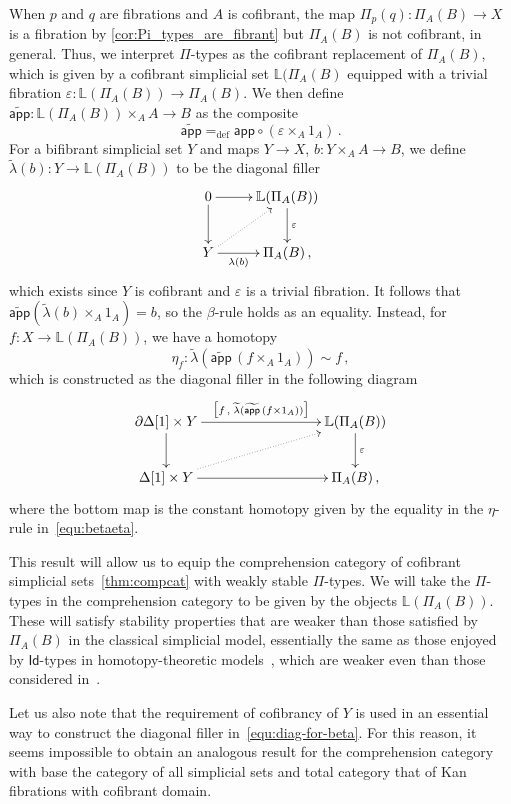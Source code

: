 \documentclass[reqno,10pt,a4paper,oneside,draft]{amsart}
\numberwithin{equation}{section}
\theoremstyle{mythm}
\theoremstyle{mydef}
\theoremstyle{myrmk}
\newcommand{\defeq}{=_{\operatorname{def}}}
\newcommand{\co}{\colon}
\begin{document}
\begin{remark}
 When $p$ and $q$ are fibrations and $A$ is cofibrant, the map 
 $\Pi_p(q) \co \Pi_A(B) \to X$ is a fibration by \cref{cor:Pi_types_are_fibrant} but $\Pi_A(B)$ is not cofibrant,
 in general. Thus, we interpret  $\Pi$-types as the 
 cofibrant replacement  of $\Pi_A(B)$, which is given by a cofibrant simplicial set
 $\mathbb{L}(\Pi_A(B)$  equipped with
 a trivial fibration $\varepsilon \co \mathbb{L}(\Pi_A(B)) \to \Pi_A(B)$. 
We then define $\widetilde{\mathsf{app}} \co   \mathbb{L}(\Pi_A(B)) \times_A A \to B$ as the composite
\[
\widetilde{\mathsf{app}}  \defeq \mathsf{app} \circ (\varepsilon \times_A 1_A) \, .
\]
For a bifibrant simplicial set $Y$ and maps $Y \to X$,  $b \co Y \times_A A \to B$, we define $\widetilde{\lambda}(b) \co Y \to \mathbb{L}(\Pi_A(B))$ to be the
diagonal filler
\begin{equation}
\label{equ:diag-for-beta}
\begin{gathered}
\xymatrix{
0 \ar[r] \ar[d] & \mathbb{L}(\Pi_A(B))  \ar[d]^\varepsilon \\
Y \ar[r]_-{\lambda(b)} \ar@{.>}[ur] & \Pi_A(B) \, ,}
\end{gathered}
\end{equation} 
which exists since $Y$ is cofibrant and $\varepsilon$ is a trivial fibration. It follows 
that~$ \widetilde{\mathsf{app}}(\widetilde{\lambda}(b) \times_A 1_A) = b$, 
so the $\beta$-rule holds as an equality. Instead, for $f \co X \to \mathbb{L}(\Pi_A(B))$, we have a homotopy
\[
\eta_f  \co \widetilde{\lambda}( \widetilde{\mathsf{app}} \, (f \times_A 1_A)) \sim  f  \, ,
\]
which is constructed as the diagonal filler in the following diagram
\[
\xymatrix@C=3cm{
\partial \Delta[1] \times Y \ar[r]^-{\big[f \, , \;  \widetilde{\lambda} ( 
\widetilde{\mathsf{app}} \,  (f \times 1_A) ) \big]} \ar[d] & \mathbb{L}(\Pi_A(B)) \ar[d]^\varepsilon \\
\Delta[1] \times Y \ar[r] \ar@{.>}[ur] & \Pi_A(B) \, , }
\]
where the bottom map is the constant homotopy given by the equality in the $\eta$-rule in~\eqref{equ:betaeta}. 

This result will allow us to equip the comprehension category
of cofibrant simplicial sets~\cref{thm:compcat} with weakly stable $\Pi$-types. We 
will take the $\Pi$-types in the comprehension category to be given by the objects
$ \mathbb{L}(\Pi_A(B))$. These will satisfy  stability properties that are weaker than those satisfied by $\Pi_A(B)$ in the classical simplicial model, 
essentially the same as those enjoyed by $\mathsf{Id}$-types in homotopy-theoretic models~\cite{awodey-warren:homotopy-idtype}, which are weaker even than those considered in~\cite{CarboniA:locccec}.  

Let us also note that the requirement of cofibrancy of $Y$ is used in an 
essential way to construct the diagonal filler in~\eqref{equ:diag-for-beta}. For this
reason, it seems impossible to obtain an analogous result for the comprehension category 
with base the category of all simplicial sets and total category that of Kan fibrations 
with cofibrant domain.
\end{remark}
\end{document}
